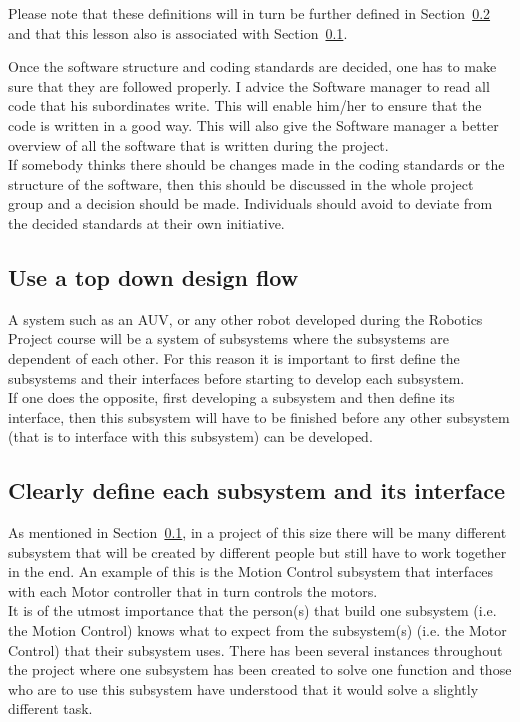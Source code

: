 Please note that these definitions will in turn be further defined in Section~\ref{sec:define} and that this lesson also is associated with Section~\ref{sec:top_down}.

Once the software structure and coding standards are decided, one has to make sure that they are followed properly. I  advice the Software manager to read all code that his subordinates write. This will enable him/her to ensure that the code is written in a good way. This will also give the Software manager a better overview of all the software that is written during the project. \\
If somebody thinks there should be changes made in the coding standards or the structure of the software, then this should be discussed in the whole project group and a decision should be made. Individuals should avoid to deviate from the decided standards at their own initiative.


\subsection{Use a top down design flow}\label{sec:top_down}
A system such as an AUV, or any other robot developed during the Robotics Project course will be a system of subsystems where the subsystems are dependent of each other. For this reason it is important to first define the subsystems and their interfaces before starting to develop each subsystem. \\
If one does the opposite, first developing a subsystem and then define its interface, then this subsystem will have to be finished before any other subsystem (that is to interface with this subsystem) can be developed. 


\subsection{Clearly define each subsystem and its interface}\label{sec:define}
As mentioned in Section~\ref{sec:top_down}, in a project of this size there will be many different subsystem that will be created by different people but still have to work together in the end. An example of this is the Motion Control subsystem that interfaces with each Motor controller that in turn controls the motors. \\
It is of the utmost importance that the person(s) that build one subsystem (i.e. the Motion Control) knows what to expect from the subsystem(s) (i.e. the Motor Control) that their subsystem uses. There has been several instances throughout the project where one subsystem has been created to solve one function and those who are to use this subsystem have understood that it would solve a slightly different task. 

